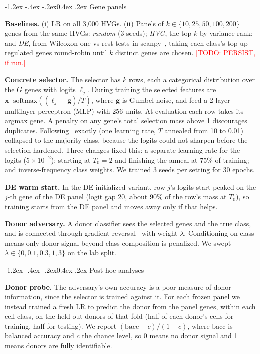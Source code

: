\documentclass[11pt]{article}
\makeatletter
\renewcommand\subsection{\@startsection{subsection}{2}{\z@}%
    {-1.2ex \@plus -.4ex \@minus -.2ex}{0.4ex \@plus .2ex}%
    {\normalfont\normalsize\bfseries}}
\newcommand{\todo}[1]{\textcolor{red}{[TODO: #1]}}
\makeatother
\begin{document}
\subsection{Gene panels}

\textbf{Baselines.} (i) LR on all 3{,}000 HVGs. (ii) Panels of $k\in\{10,25,50,100,200\}$
genes from the same HVGs: \emph{random} (3 seeds); \emph{HVG}, the top $k$ by variance rank;
and \emph{DE}, from Wilcoxon one-vs-rest tests in scanpy~\cite{wolf2018}, taking each
class's top up-regulated genes round-robin until $k$ distinct genes are chosen.
\todo{PERSIST, if run.}

\textbf{Concrete selector.} The selector has $k$ rows, each a categorical distribution over
the $G$ genes with logits $\boldsymbol\ell_j$. During training the selected features are
$\mathbf{x}^\top\mathrm{softmax}((\boldsymbol\ell_j+\mathbf{g})/T)$, where $\mathbf{g}$ is
Gumbel noise, and feed a 2-layer multilayer perceptron (MLP) with 256 units. At evaluation
each row takes its argmax gene. A penalty on any gene's total selection mass above 1
discourages duplicates. Following~\cite{abid2019} exactly (one learning rate, $T$ annealed
from 10 to 0.01) collapsed to the majority class, because the logits could not sharpen before
the selection hardened. Three changes fixed this: a separate learning rate for the logits
($5\times10^{-2}$); starting at $T_0=2$ and finishing the anneal at 75\% of training; and
inverse-frequency class weights. We trained 3 seeds per setting for 30 epochs.

\textbf{DE warm start.} In the DE-initialized variant, row $j$'s logits start peaked on the
$j$-th gene of the DE panel (logit gap 20, about 90\% of the row's mass at $T_0$), so
training starts from the DE panel and moves away only if that helps.

\textbf{Donor adversary.} A donor classifier sees the selected genes and the true class, and
is connected through gradient reversal~\cite{ganin2016} with weight $\lambda$. Conditioning on
class means only donor signal beyond class composition is penalized. We swept
$\lambda\in\{0, 0.1, 0.3, 1, 3\}$ on the lab split.

\subsection{Post-hoc analyses}

\textbf{Donor probe.} The adversary's own accuracy is a poor measure of donor information,
since the selector is trained against it. For each frozen panel we instead trained a fresh
LR to predict the donor from the panel genes, within each cell class, on the held-out donors
of that fold (half of each donor's cells for training, half for testing). We report
$(\mathrm{bacc}-c)/(1-c)$, where bacc is balanced accuracy and $c$ the chance level, so 0
means no donor signal and 1 means donors are fully identifiable.
\end{document}
